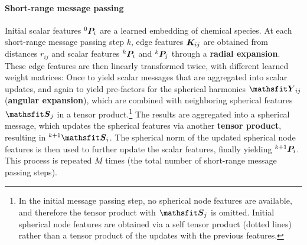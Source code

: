 \documentclass[10pt]{article} %
\begin{document}
\paragraph{Short-range message passing}

Initial scalar features ${}^0{\bm{P}}_i$ are a learned embedding of chemical species.
At each short-range message passing step $k$, edge features ${\bm{K}}_{ij}$ are obtained from distances $r_{ij}$ and scalar features ${}^k{\bm{P}}_i$ and ${}^k{\bm{P}}_j$ through a {\bf radial expansion}.
These edge features are then linearly transformed twice, with different learned weight matrices: Once to yield scalar messages that are aggregated into scalar updates, and again to yield pre-factors for the spherical harmonics $\tY_{ij}$ ({\bf angular expansion}), which are combined with neighboring spherical features $\tS_j$ in a tensor product.\footnote{In the initial message passing step, no spherical node features are available, and therefore the tensor product with $\tS_j$ is omitted. Initial spherical node features are obtained via a self tensor product (dotted lines) rather than a tensor product of the updates with the previous features.}
The results are aggregated into a spherical message, which updates the spherical features via another {\bf tensor product}, resulting in ${}^{k+1}\sphf_i$.
The spherical norm of the updated spherical node features is then used to further update the scalar features, finally yielding  ${}^{k+1}{\bm{P}}_i$.
This process is repeated $M$ times (the total number of short-range message passing steps). 

\end{document}
